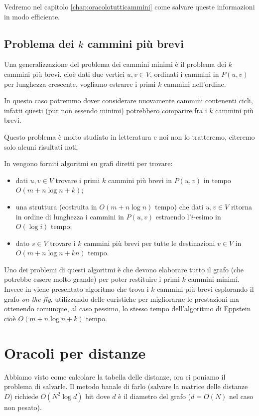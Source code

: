\documentclass[a4paper,10pt]{amsbook}
\theoremstyle{plain}
\theoremstyle{definition}
\theoremstyle{remark}
\newcommand{\pa}[1]{\left(#1\right)}
\begin{document}
Vedremo nel capitolo \ref{chap:oracolotutticammini} come salvare
queste informazioni in modo efficiente.

\section{Problema dei $k$ cammini più brevi}
\label{sec:kcammini}

Una generalizzazione del problema dei cammini minimi è il problema dei
$k$ cammini più brevi, cioè dati due vertici $u,v \in V$, ordinati i
cammini in $P(u,v)$ per lunghezza crescente, vogliamo estrarre i primi
$k$ cammini nell'ordine.

In questo caso potremmo dover considerare nuovamente cammini
contenenti cicli, infatti questi (pur non essendo minimi) potrebbero
comparire fra i $k$ cammini più brevi.

Questo problema è molto studiato in letteratura e noi non lo
tratteremo, citeremo solo alcuni risultati noti.

In \cite{kshortest} vengono forniti algoritmi su grafi diretti per
trovare:
\begin{itemize}
\item dati $u,v \in V$ trovare i primi $k$ cammini più brevi in
  $P\pa{u,v}$ in tempo $O\pa{m + n\log n + k}$;
\item una struttura (costruita in $O\pa{m+n\log n}$ tempo) che dati
  $u,v\in V$ ritorna in ordine di lunghezza i cammini in $P(u,v)$
  estraendo l'$i$-esimo in $O\pa{\log i}$ tempo;
\item dato $s\in V$ trovare i $k$ cammini più brevi per tutte le
  destinazioni $v\in V$ in $O\pa{m + n\log n + kn}$ tempo.
\end{itemize}

Uno dei problemi di questi algoritmi è che devono elaborare tutto il
grafo (che potrebbe essere molto grande) per poter restituire i primi
$k$ cammini minimi. Invece in \cite{kspheur} viene presentato
algoritmo che trova i $k$ cammini più brevi esplorando il grafo
\textit{on-the-fly}, utilizzando delle euristiche per migliorarne le
prestazioni ma ottenendo comunque, al caso pessimo, lo stesso tempo
dell'algoritmo di Eppstein cioè $O\pa{m + n\log n + k}$ tempo.

\chapter{Oracoli per distanze}
\label{chap:distanze}

Abbiamo visto come calcolare la tabella delle distanze, ora ci poniamo
il problema di salvarle. Il metodo banale di farlo (salvare la matrice
delle distanze $D$) richiede $O\pa{ N^2 \log d}$ bit dove $d$ è il
diametro del grafo ($d = O\pa{N}$ nel caso non pesato).
\end{document}
